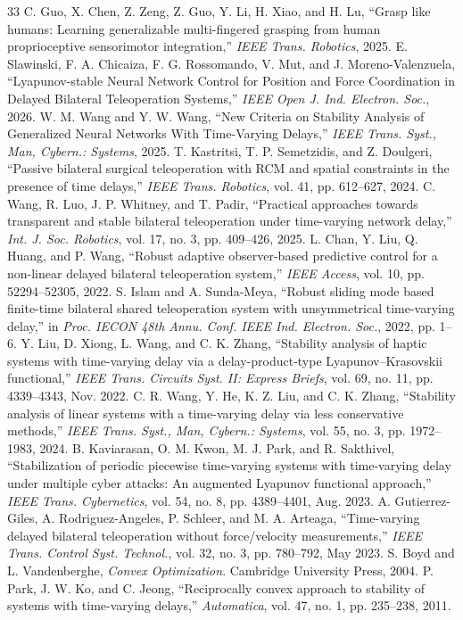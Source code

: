 \documentclass[letterpaper,journal]{IEEEtran}
\begin{document}
\begin{thebibliography}{33}
C. Guo, X. Chen, Z. Zeng, Z. Guo, Y. Li, H. Xiao, and H. Lu, ``Grasp like humans: Learning generalizable multi-fingered grasping from human proprioceptive sensorimotor integration,'' \textit{IEEE Trans. Robotics}, 2025.
E. Slawinski, F. A. Chicaiza, F. G. Rossomando, V. Mut, and J. Moreno-Valenzuela, ``Lyapunov-stable Neural Network Control for Position and Force Coordination in Delayed Bilateral Teleoperation Systems,'' \textit{IEEE Open J. Ind. Electron. Soc.}, 2026.
W. M. Wang and Y. W. Wang, ``New Criteria on Stability Analysis of Generalized Neural Networks With Time-Varying Delays,'' \textit{IEEE Trans. Syst., Man, Cybern.: Systems}, 2025.
T. Kastritsi, T. P. Semetzidis, and Z. Doulgeri, ``Passive bilateral surgical teleoperation with RCM and spatial constraints in the presence of time delays,'' \textit{IEEE Trans. Robotics}, vol. 41, pp. 612--627, 2024.
C. Wang, R. Luo, J. P. Whitney, and T. Padir, ``Practical approaches towards transparent and stable bilateral teleoperation under time-varying network delay,'' \textit{Int. J. Soc. Robotics}, vol. 17, no. 3, pp. 409--426, 2025.
L. Chan, Y. Liu, Q. Huang, and P. Wang, ``Robust adaptive observer-based predictive control for a non-linear delayed bilateral teleoperation system,'' \textit{IEEE Access}, vol. 10, pp. 52294--52305, 2022.
S. Islam and A. Sunda-Meya, ``Robust sliding mode based finite-time bilateral shared teleoperation system with unsymmetrical time-varying delay,'' in \textit{Proc. IECON 48th Annu. Conf. IEEE Ind. Electron. Soc.}, 2022, pp. 1--6.
Y. Liu, D. Xiong, L. Wang, and C. K. Zhang, ``Stability analysis of haptic systems with time-varying delay via a delay-product-type Lyapunov–Krasovskii functional,'' \textit{IEEE Trans. Circuits Syst. II: Express Briefs}, vol. 69, no. 11, pp. 4339--4343, Nov. 2022.
C. R. Wang, Y. He, K. Z. Liu, and C. K. Zhang, ``Stability analysis of linear systems with a time-varying delay via less conservative methods,'' \textit{IEEE Trans. Syst., Man, Cybern.: Systems}, vol. 55, no. 3, pp. 1972--1983, 2024.
B. Kaviarasan, O. M. Kwon, M. J. Park, and R. Sakthivel, ``Stabilization of periodic piecewise time-varying systems with time-varying delay under multiple cyber attacks: An augmented Lyapunov functional approach,'' \textit{IEEE Trans. Cybernetics}, vol. 54, no. 8, pp. 4389--4401, Aug. 2023.
A. Gutierrez-Giles, A. Rodriguez-Angeles, P. Schleer, and M. A. Arteaga, ``Time-varying delayed bilateral teleoperation without force/velocity measurements,'' \textit{IEEE Trans. Control Syst. Technol.}, vol. 32, no. 3, pp. 780--792, May 2023.
S. Boyd and L. Vandenberghe, \textit{Convex Optimization}. Cambridge University Press, 2004.
P. Park, J. W. Ko, and C. Jeong, ``Reciprocally convex approach to stability of systems with time-varying delays,'' \textit{Automatica}, vol. 47, no. 1, pp. 235--238, 2011.
\end{thebibliography}
\end{document}
